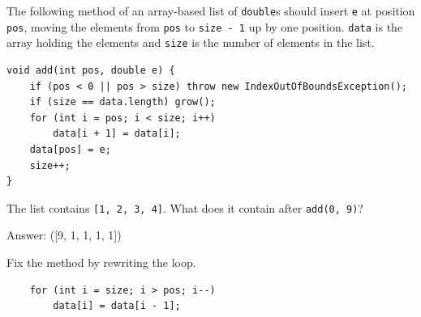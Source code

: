 \begin{question}
The following method of an array-based list of \lstinline|double|s should insert \lstinline|e| at position \lstinline|pos|, moving the elements from \lstinline|pos| to \lstinline|size - 1| up by one position.
\lstinline|data| is the array holding the elements and \lstinline|size| is the number of elements in the list.

\begin{lstlisting}
void add(int pos, double e) {
    if (pos < 0 || pos > size) throw new IndexOutOfBoundsException();
    if (size == data.length) grow();
    for (int i = pos; i < size; i++)
        data[i + 1] = data[i];
    data[pos] = e;
    size++;
}
\end{lstlisting}

The list contains \lstinline|[1, 2, 3, 4]|. What does it contain after \lstinline|add(0, 9)|?

Answer: \underline{\hspace{2in}} \ifanswers ([9, 1, 1, 1, 1])\fi

Fix the method by rewriting the loop.

\ifanswers
\begin{lstlisting}
    for (int i = size; i > pos; i--)
        data[i] = data[i - 1];
\end{lstlisting}
\else
\vspace{0.8in}
\fi
\end{question}

